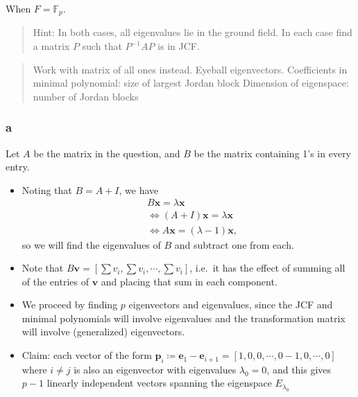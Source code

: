 When \(F = {\mathbb{F}}_p\).

\begin{quote}
Hint: In both cases, all eigenvalues lie in the ground field. In each
case find a matrix \(P\) such that \(P^{-1}AP\) is in JCF.
\end{quote}

\begin{solution}

\begin{quote}
Work with matrix of all ones instead. Eyeball eigenvectors. Coefficients
in minimal polynomial: size of largest Jordan block Dimension of
eigenspace: number of Jordan blocks
\end{quote}

\hypertarget{a-111}{%
\subsubsection{a}\label{a-111}}

Let \(A\) be the matrix in the question, and \(B\) be the matrix
containing 1's in every entry.

\begin{itemize}
\item
  Noting that \(B = A+I\), we have
  \begin{align*}
  &B\mathbf{x} = \lambda \mathbf{x} \\
  &\iff (A+I) \mathbf{x} = \lambda \mathbf{x} \\
  &\iff A \mathbf{x} = (\lambda - 1) \mathbf{x}
  ,\end{align*}
  so we will find the eigenvalues of \(B\) and subtract one from each.
\item
  Note that
  \(B\mathbf{v} = {\left[ {\sum v_i, \sum v_i, \cdots, \sum v_i} \right]}\),
  i.e.~it has the effect of summing all of the entries of \(\mathbf{v}\)
  and placing that sum in each component.
\item
  We proceed by finding \(p\) eigenvectors and eigenvalues, since the
  JCF and minimal polynomials will involve eigenvalues and the
  transformation matrix will involve (generalized) eigenvectors.
\item
  Claim: each vector of the form
  \(\mathbf{p}_i \coloneqq\mathbf{e}_1 - \mathbf{e}_{i+1} = {\left[ {1, 0, 0,\cdots, 0 -1, 0, \cdots, 0 } \right]}\)
  where \(i\neq j\) is also an eigenvector with eigenvalues
  \(\lambda_0 = 0\), and this gives \(p-1\) linearly independent vectors
  spanning the eigenspace \(E_{\lambda_0}\)


\end{itemize}
\end{solution}
